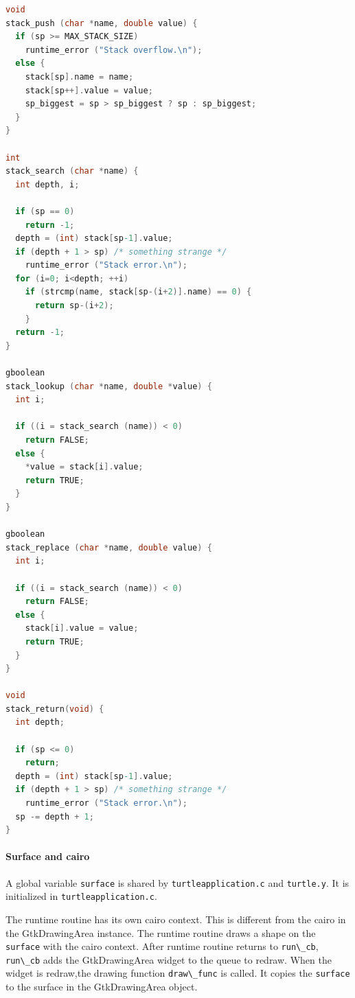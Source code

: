 \begin{lstlisting}[language=C]
void
stack_push (char *name, double value) {
  if (sp >= MAX_STACK_SIZE)
    runtime_error ("Stack overflow.\n");
  else {
    stack[sp].name = name;
    stack[sp++].value = value;
    sp_biggest = sp > sp_biggest ? sp : sp_biggest;
  }
}

int
stack_search (char *name) {
  int depth, i;

  if (sp == 0)
    return -1;
  depth = (int) stack[sp-1].value;
  if (depth + 1 > sp) /* something strange */
    runtime_error ("Stack error.\n");
  for (i=0; i<depth; ++i)
    if (strcmp(name, stack[sp-(i+2)].name) == 0) {
      return sp-(i+2);
    }
  return -1;
}

gboolean
stack_lookup (char *name, double *value) {
  int i;

  if ((i = stack_search (name)) < 0)
    return FALSE;
  else {
    *value = stack[i].value;
    return TRUE;
  }
}

gboolean
stack_replace (char *name, double value) {
  int i;

  if ((i = stack_search (name)) < 0)
    return FALSE;
  else {
    stack[i].value = value;
    return TRUE;
  }
}

void
stack_return(void) {
  int depth;

  if (sp <= 0)
    return;
  depth = (int) stack[sp-1].value;
  if (depth + 1 > sp) /* something strange */
    runtime_error ("Stack error.\n");
  sp -= depth + 1;
}
\end{lstlisting}

\paragraph{Surface and cairo}\label{surface-and-cairo}

A global variable \passthrough{\lstinline!surface!} is shared by
\passthrough{\lstinline!turtleapplication.c!} and
\passthrough{\lstinline!turtle.y!}. It is initialized in
\passthrough{\lstinline!turtleapplication.c!}.

The runtime routine has its own cairo context. This is different from
the cairo in the GtkDrawingArea instance. The runtime routine draws a
shape on the \passthrough{\lstinline!surface!} with the cairo context.
After runtime routine returns to \passthrough{\lstinline!run\_cb!},
\passthrough{\lstinline!run\_cb!} adds the GtkDrawingArea widget to the
queue to redraw. When the widget is redraw,the drawing function
\passthrough{\lstinline!draw\_func!} is called. It copies the
\passthrough{\lstinline!surface!} to the surface in the GtkDrawingArea
object.

